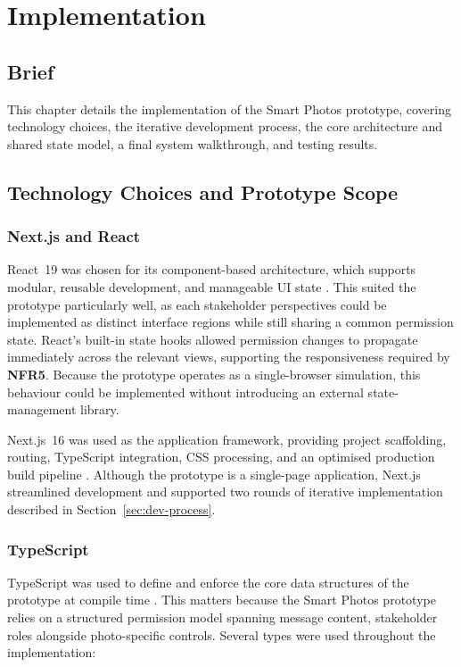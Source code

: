 \chapter{Implementation}
\section{Brief}
This chapter details the implementation of the Smart Photos prototype, covering technology choices, the iterative development process, the core architecture and shared state model, a final system walkthrough, and testing results.

\section{Technology Choices and Prototype Scope}\label{sec:tech-choices}

\subsection*{Next.js and React}

React~19 was chosen for its component-based architecture, which supports modular, reusable development, and manageable UI state \cite{react_docs}. This suited the prototype particularly well, as each stakeholder perspectives could be implemented as distinct interface regions while still sharing a common permission state. React's built-in state hooks allowed permission changes to propagate immediately across the relevant views, supporting the responsiveness required by \textbf{NFR5}. Because the prototype operates as a single-browser simulation, this behaviour could be implemented without introducing an external state-management library.

Next.js~16 was used as the application framework, providing project scaffolding, routing, TypeScript integration, CSS processing, and an optimised production build pipeline \cite{nextjs_docs}. Although the prototype is a single-page application, Next.js streamlined development and supported two rounds of iterative implementation described in Section~\ref{sec:dev-process}.

\subsection*{TypeScript}

TypeScript was used to define and enforce the core data structures of the prototype at compile time \cite{typescript_docs}. This matters because the Smart Photos prototype relies on a structured permission model spanning message content, stakeholder roles alongside photo-specific controls. Several types were used throughout the implementation:

